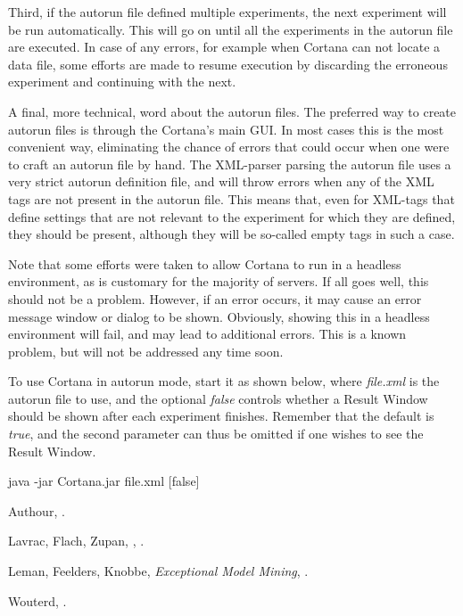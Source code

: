 \documentclass{article}
\begin{document}
Third, if the autorun file defined multiple experiments, the next experiment will be run automatically.
This will go on until all the experiments in the autorun file are executed.
In case of any errors, for example when Cortana can not locate a data file, some efforts are made to resume execution by discarding the erroneous experiment and continuing with the next.

A final, more technical, word about the autorun files.
The preferred way to create autorun files is through the Cortana's main GUI.
In most cases this is the most convenient way, eliminating the chance of errors that could occur when one were to craft an autorun file by hand.
The XML-parser parsing the autorun file uses a very strict autorun definition file, and will throw errors when any of the XML tags are not present in the autorun file.
This means that, even for XML-tags that define settings that are not relevant to the experiment for which they are defined, they should be present, although they will be so-called empty tags in such a case.

Note that some efforts were taken to allow Cortana to run in a headless environment, as is customary for the majority of servers.
If all goes well, this should not be a problem.
However, if an error occurs, it may cause an error message window or dialog to be shown.
Obviously, showing this in a headless environment will fail, and may lead to additional errors.
This is a known problem, but will not be addressed any time soon.

To use Cortana in autorun mode, start it as shown below, where \emph{file.xml} is the autorun file to use, and the optional \emph{false} controls whether a Result Window should be shown after each experiment finishes.
Remember that the default is \emph{true}, and the second parameter can thus be omitted if one wishes to see the Result Window.

java -jar Cortana.jar file.xml [false]





\begin{thebibliography}{10}

Authour,
.

Lavrac, Flach, Zupan,
,
.

Leman, Feelders, Knobbe,
\newblock \emph{Exceptional Model Mining},
.

Wouterd,
.

\end{thebibliography}
\end{document}
